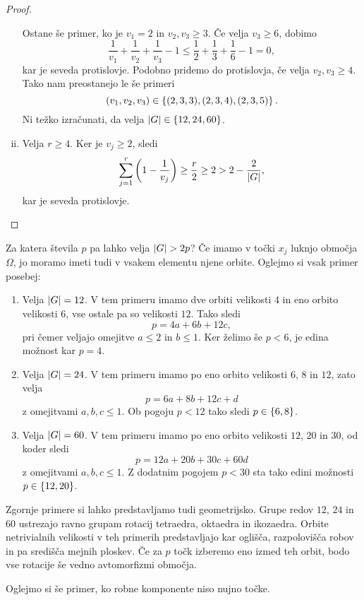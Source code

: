 \begin{proof}
\begin{enumerate}[i)]
Ostane še primer, ko je $v_1 = 2$ in $v_2, v_3 \geq 3$. Če velja
$v_3 \geq 6$, dobimo
\[
\frac{1}{v_1} + \frac{1}{v_2} + \frac{1}{v_3} - 1 \leq
\frac{1}{2} + \frac{1}{3} + \frac{1}{6} - 1 = 0,
\]
kar je seveda protislovje. Podobno pridemo do protislovja, če velja
$v_2, v_3 \geq 4$. Tako nam preostanejo le še primeri
\[
(v_1, v_2, v_3) \in \left\{(2,3,3), (2,3,4), (2,3,5)\right\}.
\]
Ni težko izračunati, da velja $\left\lvert G\right\rvert \in \left\{12, 24, 60\right\}$.

\item Velja $r \geq 4$. Ker je $v_j \geq 2$, sledi
\[
\sum_{j=1}^r \left(1 - \frac{1}{v_j}\right) \geq
\frac{r}{2} \geq 2 > 2 - \frac{2}{\left\lvert G\right\rvert},
\]
kar je seveda protislovje. \qedhere
\end{enumerate}
\end{proof}

Za katera števila $p$ pa lahko velja $\left\lvert G\right\rvert > 2p$? Če imamo v
točki $x_j$ luknjo območja $\Omega$, jo moramo imeti tudi v vsakem
elementu njene orbite. Oglejmo si vsak primer posebej:

\begin{enumerate}
\item Velja $\left\lvert G\right\rvert = 12$. V tem primeru imamo dve orbiti
velikosti $4$ in eno orbito velikosti $6$, vse ostale pa so
velikosti $12$. Tako sledi
\[
p = 4a + 6b + 12c,
\]
pri čemer veljajo omejitve $a \leq 2$ in $b \leq 1$. Ker želimo še
$p < 6$, je edina možnost kar $p = 4$.

\item Velja $\left\lvert G\right\rvert = 24$. V tem primeru imamo po eno orbito
velikosti $6$, $8$ in $12$, zato velja
\[
p = 6a + 8b + 12c + d
\]
z omejitvami $a, b, c \leq 1$. Ob pogoju $p < 12$ tako sledi
$p \in \left\{6, 8\right\}$.

\item Velja $\left\lvert G\right\rvert = 60$. V tem primeru imamo po eno orbito
velikosti $12$, $20$ in $30$, od koder sledi
\[
p = 12a + 20b + 30c + 60d
\]
z omejitvami $a, b, c \leq 1$. Z dodatnim pogojem $p < 30$ sta tako
edini možnosti $p \in \left\{12, 20\right\}$.
\end{enumerate}

Zgornje primere si lahko predstavljamo tudi geometrijsko. Grupe
redov $12$, $24$ in $60$ ustrezajo ravno grupam rotacij tetraedra,
oktaedra in ikozaedra. Orbite netrivialnih velikosti v teh primerih
predstavljajo kar oglišča, razpolovišča robov in pa središča mejnih
ploskev. Če za $p$ točk izberemo eno izmed teh orbit, bodo vse
rotacije še vedno avtomorfizmi območja.

Oglejmo si še primer, ko robne komponente niso nujno točke.

